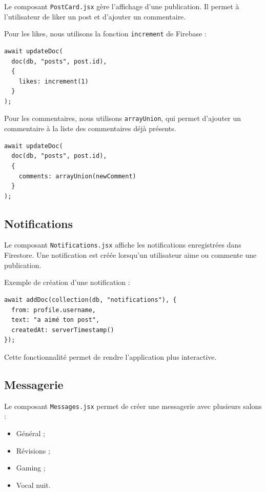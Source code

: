 \documentclass[a4paper, 12pt, twoside]{article}
\begin{document}
Le composant \texttt{PostCard.jsx} gère l'affichage d'une publication. 
Il permet à l'utilisateur de liker un post et d'ajouter un commentaire.

Pour les likes, nous utilisons la fonction \texttt{increment} de Firebase :

\begin{lstlisting}
await updateDoc(
  doc(db, "posts", post.id),
  {
    likes: increment(1)
  }
);
\end{lstlisting}

Pour les commentaires, nous utilisons \texttt{arrayUnion}, qui permet d'ajouter un commentaire à la liste des commentaires déjà présents.

\begin{lstlisting}
await updateDoc(
  doc(db, "posts", post.id),
  {
    comments: arrayUnion(newComment)
  }
);
\end{lstlisting}

\subsection{Notifications}

Le composant \texttt{Notifications.jsx} affiche les notifications enregistrées dans Firestore. 
Une notification est créée lorsqu'un utilisateur aime ou commente une publication.

Exemple de création d'une notification :

\begin{lstlisting}
await addDoc(collection(db, "notifications"), {
  from: profile.username,
  text: "a aimé ton post",
  createdAt: serverTimestamp()
});
\end{lstlisting}

Cette fonctionnalité permet de rendre l'application plus interactive.

\subsection{Messagerie}

Le composant \texttt{Messages.jsx} permet de créer une messagerie avec plusieurs salons :

\begin{itemize}
    \item Général ;
    \item Révisions ;
    \item Gaming ;
    \item Vocal nuit.
\end{itemize}
\end{document}
